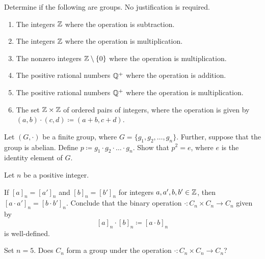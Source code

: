 \documentclass[../main.tex]{subfiles}
\begin{document}
\begin{homework}
    Determine if the following are groups. No justification is required.
    \begin{enumerate}[label=(\alph*)]
        \item The integers $\mathbb Z$ where the operation is subtraction.
        \item The integers $\mathbb Z$ where the operation is multiplication.
        \item The nonzero integers $\mathbb Z\setminus\{0\}$ where the operation is multiplication.
        \item The positive rational numbers $\mathbb Q^+$ where the operation is addition.
        \item The positive rational numbers $\mathbb Q^+$ where the operation is multiplication.
        \item The set $\mathbb Z\times\mathbb Z$ of ordered pairs of integers, where the operation is given by $(a,b)\cdot(c,d)\coloneqq(a+b,c+d)$.
    \end{enumerate}
\end{homework}

\begin{homework}
    Let $(G,\cdot)$ be a finite group, where $G=\{g_1,g_2,\ldots,g_n\}$. Further, suppose that the group is abelian. Define $p\coloneqq g_1\cdot g_2\cdot\ldots\cdot g_n$. Show that $p^2=e$, where $e$ is the identity element of $G$.
\end{homework}


\begin{homework}
    Let $n$ be a positive integer.
    \begin{listalph}
        \item If $[a]_n=[a']_n$ and $[b]_n=[b']_n$ for integers $a,a',b,b'\in\mathbb Z$, then $[a\cdot a']_n=[b\cdot b']_n$. Conclude that the binary operation $\cdot\colon C_n\times C_n\to C_n$ given by
        \[[a]_n\cdot [b]_n\coloneqq[a\cdot b]_n\]
        is well-defined.
        \item Set $n=5$. Does $C_n$ form a group under the operation $\cdot\colon C_n\times C_n\to C_n$?
    \end{listalph}
\end{homework}
\end{document}
